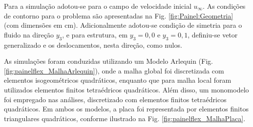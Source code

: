 \documentclass[tese_patricia]{subfiles}
\begin{document}
Para a simulação adotou-se para o campo de velocidade inicial $u_{\infty}$. As condições de contorno para o problema são apresentadas na Fig. \ref{fig:Painel:Geometria} (com dimensões em cm). Adicionalmente adotou-se condição de simetria para o fluido na direção $y_3$, e para estrutura, em $y_3=0,0$ e $y_3=0,1$, definiu-se vetor generalizado e os deslocamentos, nesta direção, como nulos.

As simulações foram conduzidas utilizando um Modelo Arlequin (Fig. \ref{fig:painelflex_MalhaArlequin}), onde a malha global foi discretizada com elementos isogeométricos quadráticos, enquanto que para malha local foram utilizados elementos finitos tetraédricos quadráticos. Além disso, um monomodelo foi empregado nas análises, discretizado com elementos finitos tetraédricos quadráticos. Em ambos os modelos, a placa foi representada por elementos finitos triangulares quadráticos, conforme ilustrado na Fig. \ref{fig:painelflex_MalhaPlaca}.
\end{document}
